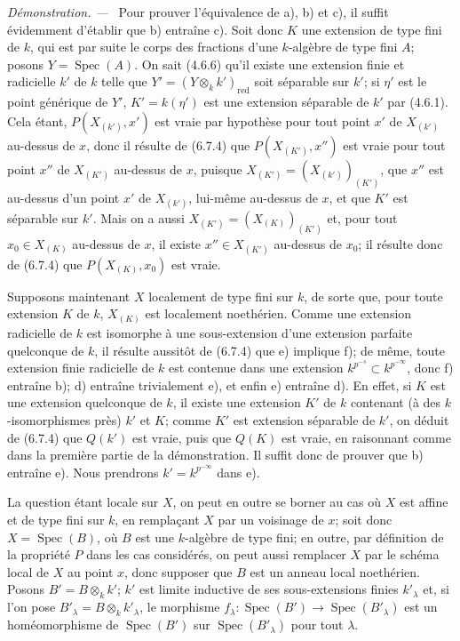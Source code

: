 \documentclass[10pt,oneside]{book}
\newenvironment{proof}{%
  \par\medskip\noindent\textit{Démonstration. ---\ }}{\par}
\begin{document}
\begin{proof}
Pour prouver l'équivalence de a), b) et c), il suffit évidemment d'établir
que b) entraîne c). Soit donc $K$ une extension de type fini de $k$, qui est
par suite le corps des fractions d'une $k$-algèbre de type fini $A$; posons
$Y=\operatorname{Spec}(A)$. On sait (4.6.6) qu'il existe une extension finie
et radicielle $k'$ de $k$ telle que $Y'=(Y\otimes_k k')_{\mathrm{red}}$ soit
séparable sur $k'$; si $\eta'$ est le point générique de $Y'$, $K'=k(\eta')$
est une extension séparable de $k'$ par (4.6.1). Cela étant,
$P(X_{(k')},x')$ est vraie par hypothèse pour tout point $x'$ de $X_{(k')}$
au-dessus de $x$, donc il résulte de (6.7.4) que $P(X_{(K')},x'')$ est vraie
pour tout point $x''$ de $X_{(K')}$ au-dessus de $x$, puisque
$X_{(K')}=(X_{(k')})_{(K')}$, que $x''$ est au-dessus d'un point $x'$ de
$X_{(k')}$, lui-même au-dessus de $x$, et que $K'$ est séparable sur $k'$.
Mais on a aussi
$X_{(K')}=(X_{(K)})_{(K')}$ et, pour tout $x_0\in X_{(K)}$ au-dessus de
$x$, il existe $x''\in X_{(K')}$ au-dessus de $x_0$; il résulte donc de
(6.7.4) que $P(X_{(K)},x_0)$ est vraie.

Supposons maintenant $X$ localement de type fini sur $k$, de sorte que, pour
toute extension $K$ de $k$, $X_{(K)}$ est localement noethérien. Comme une
extension radicielle de $k$ est isomorphe à une sous-extension d'une extension
parfaite quelconque de $k$, il résulte aussitôt de (6.7.4) que e) implique f);
de même, toute extension finie radicielle de $k$ est contenue dans une
extension $k^{p^{-s}}\subset k^{p^{-\infty}}$, donc f) entraîne b); d) entraîne
trivialement e), et enfin e) entraîne d). En effet, si $K$ est une extension
quelconque de $k$,
il existe une extension $K'$ de $k$ contenant (à des $k$-isomorphismes près)
$k'$ et $K$; comme $K'$ est extension séparable de $k'$, on déduit de (6.7.4)
que $Q(k')$ est vraie, puis que $Q(K)$ est vraie, en raisonnant comme dans la
première partie de la démonstration. Il suffit donc de prouver que b) entraîne
e). Nous prendrons $k'=k^{p^{-\infty}}$ dans e).

La question étant locale sur $X$, on peut en outre se borner au cas où $X$
est affine et de type fini sur $k$, en remplaçant $X$ par un voisinage de $x$;
soit donc $X=\operatorname{Spec}(B)$, où $B$ est une $k$-algèbre de type fini;
en outre, par définition de la propriété $P$ dans les cas considérés, on peut
aussi remplacer $X$ par le schéma local de $X$ au point $x$, donc supposer que
$B$ est un anneau local noethérien. Posons $B'=B\otimes_k k'$; $k'$ est
limite inductive de ses sous-extensions finies $k'_\lambda$ et, si l'on pose
$B'_\lambda=B\otimes_k k'_\lambda$, le morphisme
$f_\lambda:\operatorname{Spec}(B')\to\operatorname{Spec}(B'_\lambda)$ est
un homéomorphisme de $\operatorname{Spec}(B')$ sur
$\operatorname{Spec}(B'_\lambda)$ pour tout $\lambda$.


\end{proof}
\end{document}
